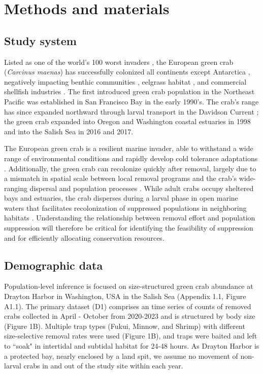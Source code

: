 \documentclass{article}
\begin{document}
\section{Methods and materials}

\subsection{Study system}

Listed as one of the world’s 100 worst invaders \parencite{lowe2000100}, the European green crab (\textit{Carcinus maenas}) has successfully colonized all continents except Antarctica \parencite{yamada2001global}, negatively impacting benthic communities \parencite{grosholz2005recent}, eelgrass habitat \parencite{garbary2014drastic, howard2019habitat}, and commercial shellfish industries \parencite{grosholz2011modeling}. The first introduced green crab population in the Northeast Pacific was established in San Francisco Bay in the early 1990's. The crab's range has since expanded northward through larval transport in the Davidson Current \parencite{yamada2021ocean}; the green crab expanded into Oregon and Washington coastal estuaries in 1998 and into the Salish Sea in 2016 and 2017. 

The European green crab is a resilient marine invader, able to withstand a wide range of environmental conditions and rapidly develop cold tolerance adaptations \parencite{tepolt2020rapid}. Additionally, the green crab can recolonize quickly after removal, largely due to a mismatch in spatial scale between local removal programs and the crab’s wide-ranging dispersal and population processes \parencite{keller2025transition}. While adult crabs occupy sheltered bays and estuaries, the crab disperses during a larval phase in open marine waters that facilitates recolonization of suppressed populations in neighboring habitats \parencite{yamada2021ocean}. Understanding the relationship between removal effort and population suppression will therefore be critical for identifying the feasibility of suppression and for efficiently allocating conservation resources. 

\subsection{Demographic data}

Population-level inference is focused on size-structured green crab abundance at Drayton Harbor in Washington, USA in the Salish Sea (Appendix 1.1, Figure A1.1). The primary dataset (D1) comprises an time series of counts of removed crabs collected in April - October from 2020-2023 and is structured by body size (Figure 1B). Multiple trap types (Fukui, Minnow, and Shrimp) with different size-selective removal rates were used (Figure 1B), and traps were baited and left to ``soak" in intertidal and subtidal habitat for 24-48 hours. As Drayton Harbor is a protected bay, nearly enclosed by a land spit, we assume no movement of non-larval crabs in and out of the study site within each year. 
\end{document}
